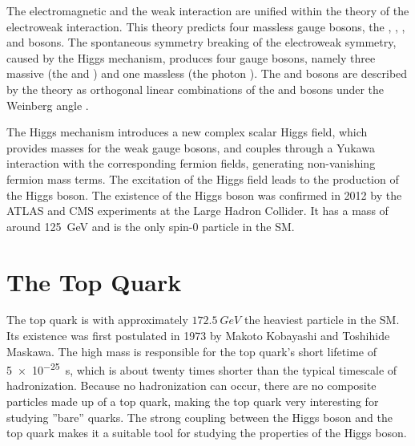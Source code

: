 The electromagnetic and the weak interaction are unified within the theory of the electroweak interaction. This theory predicts four massless gauge bosons, the \PBzero, \PWone, \PWtwo, and \PWthree bosons. The spontaneous symmetry breaking of the electroweak symmetry, caused by the Higgs mechanism, produces four gauge bosons, namely three massive (the \PZzero and \PWpm) and one massless (the photon \Pphoton). The \PZzero and \PWpm bosons are described by the theory as orthogonal linear combinations of the \PBzero and \PWone bosons under the Weinberg angle \cite{wiki:electroweak}.

The Higgs mechanism introduces a new complex scalar Higgs field, which provides masses for the weak gauge bosons, and couples through a Yukawa interaction with the corresponding fermion fields, generating non-vanishing fermion mass terms. The excitation of the Higgs field leads to the production of the Higgs boson. The existence of the Higgs boson was confirmed in 2012 by the ATLAS and CMS experiments at the Large Hadron Collider. It has a mass of around \SI{125}{\giga\eV} \cite{Cha12} and is the only spin-0 particle in the SM.

\section{The Top Quark}
\label{sec:theory_top}
The top quark is with approximately $\SI{172.5}{GeV}$ \cite{ACCC14} the heaviest particle in the SM. Its existence was first postulated in 1973 by Makoto Kobayashi and Toshihide Maskawa. The high mass is responsible for the top quark's short lifetime of \SI{5e-25}{s}, which is about twenty times shorter than the typical timescale of hadronization. Because no hadronization can occur, there are no composite particles made up of a top quark, making the top quark very interesting for studying ''bare'' quarks. The strong coupling between the Higgs boson and the top quark makes it a suitable tool for studying the properties of the Higgs boson.

